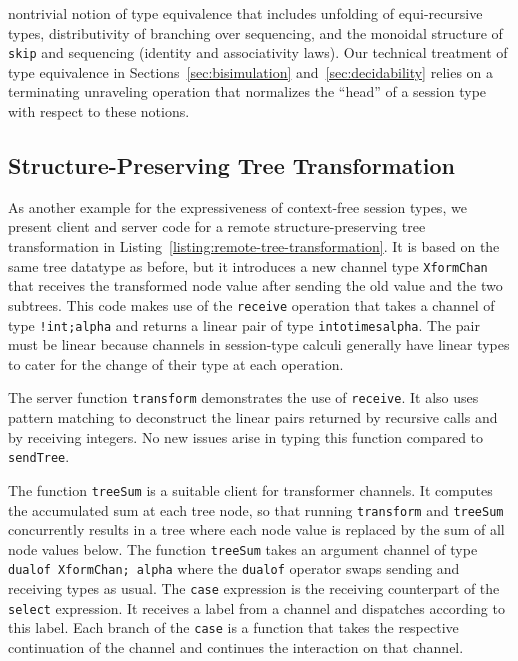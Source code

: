 nontrivial notion of type equivalence that includes unfolding of
equi-recursive types, distributivity of branching over sequencing, and the
monoidal structure of \lstinline|skip| and sequencing (identity and
associativity laws). Our technical treatment of type equivalence in
Sections~\ref{sec:bisimulation} and~\ref{sec:decidability}
relies on a terminating unraveling operation that normalizes the
``head'' of a session type with respect to these notions. 

\subsection{Structure-Preserving Tree Transformation}
\label{sec:remote-tree-transf}

As another example for the expressiveness of context-free session
types, we present client and server code for a remote structure-preserving tree
transformation in Listing~\ref{listing:remote-tree-transformation}. It is based on the same tree datatype as before, but
it introduces a new channel type \lstinline|XformChan| that
receives the transformed node value after sending the old value and
the two subtrees. This code makes use of the \lstinline|receive|
operation that takes a channel of type \lstinline|!int;alpha| and
returns a linear pair of type \lstinline|intotimesalpha|. The pair
must be linear because channels in session-type calculi generally have
linear types to cater for the change of their type at each operation.


The server function \lstinline|transform| demonstrates the use of
\lstinline|receive|. It also uses pattern matching to deconstruct the
linear pairs returned by recursive calls and by receiving integers. No
new issues arise in typing this function compared to
\lstinline|sendTree|. 

The function \lstinline|treeSum| is a suitable client for transformer
channels. It computes the accumulated sum at each tree node, so that
running \lstinline|transform| and
\lstinline|treeSum| concurrently results in a tree where each node value is
replaced by the sum of all node values below. The function
\lstinline|treeSum| takes an argument channel of type
\lstinline|dualof XformChan; alpha| where the \lstinline|dualof|
operator swaps sending and receiving types as usual. The
\lstinline|case| expression is the receiving counterpart of the
\lstinline|select| expression. It receives a label from a channel and
dispatches according to this label. Each branch of the
\lstinline|case| is a function that takes the respective continuation
of the channel and continues the interaction on that channel.

